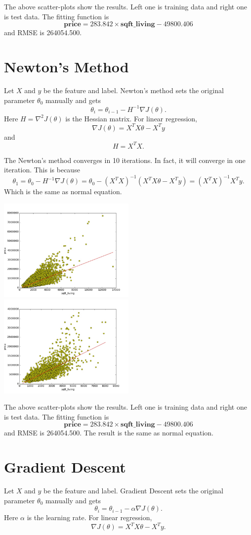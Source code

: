 \documentclass{article}
\begin{document}
The above scatter-plots show the results. Left one is training data and right one is test data. The fitting function is $$\mathbf{price}=283.842\times\mathbf{sqft\_living}-49800.406$$ and RMSE is 264054.500.

\section{Newton's Method}
Let $X$ and $y$ be the feature and label. Newton's method sets the original parameter $\theta_0$ manually and gets $$\theta_i=\theta_{i-1}-H^{-1}\nabla J(\theta).$$ Here $H=\nabla^2J(\theta)$ is the Hessian matrix. For linear regression, $$\nabla J(\theta)=X^TX\theta-X^Ty$$ and $$H=X^TX.$$

The Newton's method converges in 10 iterations. In fact, it will converge in one iteration. This is because $$\theta_1=\theta_0-H^{-1}\nabla J(\theta)= \theta_0-(X^TX)^{-1}(X^TX\theta-X^Ty)=(X^TX)^{-1}X^Ty.$$
Which is the same as normal equation.

\includegraphics[width=0.5\textwidth]{../result/required_train_newtons_method.jpg}
\includegraphics[width=0.5\textwidth]{../result/required_test_newtons_method.jpg}

The above scatter-plots show the results. Left one is training data and right one is test data. The fitting function is $$\mathbf{price}=283.842\times\mathbf{sqft\_living}-49800.406$$ and RMSE is 264054.500. The result is the same as normal equation.

\section{Gradient Descent}
Let $X$ and $y$ be the feature and label. Gradient Descent sets the original parameter $\theta_0$ manually and gets $$\theta_i=\theta_{i-1}-\alpha\nabla J(\theta).$$ Here $\alpha$ is the learning rate. For linear regression, $$\nabla J(\theta)=X^TX\theta-X^Ty.$$
\end{document}
